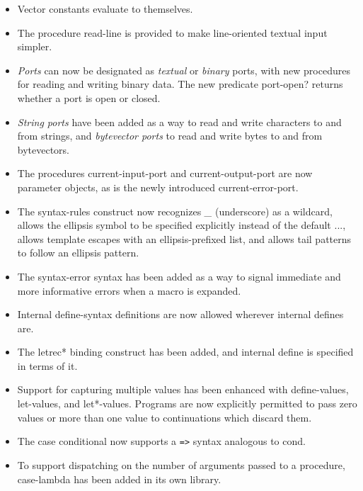 \begin{itemize}
\item Vector constants evaluate to themselves.

\item The procedure {\cf read-line} is provided to make line-oriented textual input
simpler.

\item {\em Ports} can now be designated as {\em textual} or {\em
binary} ports, with new procedures for reading and writing binary
data.
The new predicate {\cf port-open?} returns whether a port is open or closed.

\item {\em String ports} have been added as a way to read and write
characters to and from strings, and {\em bytevector ports} to read
and write bytes to and from bytevectors.

\item The procedures {\cf current-input-port} and {\cf current-output-port} are now
parameter objects, as is the newly introduced {\cf
current-error-port}.

\item The {\cf syntax-rules} construct now recognizes {\em \_} (underscore) 
as a wildcard, allows
the ellipsis symbol to be specified explicitly instead of the default
{\cf ...}, allows template escapes with an ellipsis-prefixed list, and
allows tail patterns to follow an ellipsis pattern.

\item The {\cf syntax-error} syntax has been added as a way to signal immediate
and more informative errors when a macro is expanded.

\item Internal {\cf define-syntax} definitions are now allowed wherever
internal {\cf define}s are.

\item The {\cf letrec*} binding construct has been added, and internal {\cf define} 
is specified in terms of it.

\item Support for capturing multiple values has been enhanced with {\cf
define-values}, {\cf let-values}, and {\cf let*-values}.
Programs are now explicitly permitted to pass zero values or more than one
value to continuations which discard them.

\item The {\cf case} conditional now supports a {\tt =>} syntax analogous to {\cf cond}.

\item To support dispatching on the number of arguments passed to a
procedure, {\cf case-lambda} has been added in its own library.


\end{itemize}
